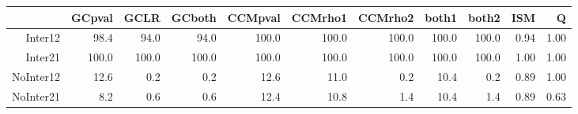 \begin{table}[ht]
\centering
\begin{tabular}{rrrrrrrrrrr}
  \hline
 & GCpval & GCLR & GCboth & CCMpval & CCMrho1 & CCMrho2 & both1 & both2 & ISM & Q \\ 
  \hline
Inter12 & 98.4 & 94.0 & 94.0 & 100.0 & 100.0 & 100.0 & 100.0 & 100.0 & 0.94 & 1.00 \\ 
  Inter21 & 100.0 & 100.0 & 100.0 & 100.0 & 100.0 & 100.0 & 100.0 & 100.0 & 1.00 & 1.00 \\ 
  NoInter12 & 12.6 & 0.2 & 0.2 & 12.6 & 11.0 & 0.2 & 10.4 & 0.2 & 0.89 & 1.00 \\ 
  NoInter21 & 8.2 & 0.6 & 0.6 & 12.4 & 10.8 & 1.4 & 10.4 & 1.4 & 0.89 & 0.63 \\ 
   \hline
\end{tabular}
\end{table}
